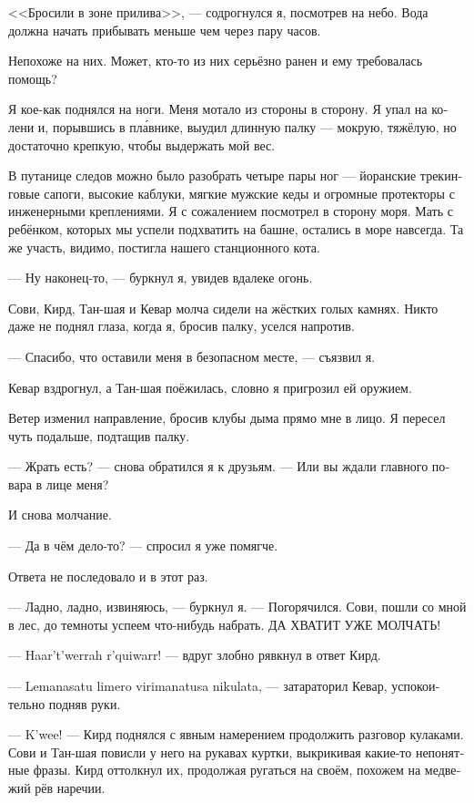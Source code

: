 \documentclass[a4paper,12pt,fleqn]{book}\usepackage{polyglossia}\setdefaultlanguage[babelshorthands=true]{russian}\setotherlanguage{english}\defaultfontfeatures{Ligatures=TeX,Mapping=tex-text}
\newcommand{\asterism}{\vspace{1em}{\centering\Large\bfseries$\ast~\ast~\ast$\par}\vspace{1em}}
\begin{document}
<<Бросили в зоне прилива>>, --- содрогнулся я, посмотрев на небо.
Вода должна начать прибывать меньше чем через пару часов.

Непохоже на них.
Может, кто-то из них серьёзно ранен и ему требовалась помощь?

Я кое-как поднялся на ноги.
Меня мотало из стороны в сторону.
Я упал на колени и, порывшись в пл\'{а}внике, выудил длинную палку --- мокрую, тяжёлую, но достаточно крепкую, чтобы выдержать мой вес.

В путанице следов можно было разобрать четыре пары ног --- йоранские трекинговые сапоги, высокие каблуки, мягкие мужские кеды и огромные протекторы с инженерными креплениями.
Я с сожалением посмотрел в сторону моря.
Мать с ребёнком, которых мы успели подхватить на башне, остались в море навсегда.
Та же участь, видимо, постигла нашего станционного кота.

\asterism

--- Ну наконец-то, --- буркнул я, увидев вдалеке огонь.

Сови, Кирд, Тан-шая и Кевар молча сидели на жёстких голых камнях.
Никто даже не поднял глаза, когда я, бросив палку, уселся напротив.

--- Спасибо, что оставили меня в безопасном месте, --- съязвил я.

Кевар вздрогнул, а Тан-шая поёжилась, словно я пригрозил ей оружием.

Ветер изменил направление, бросив клубы дыма прямо мне в лицо.
Я пересел чуть подальше, подтащив палку.

--- Жрать есть? --- снова обратился я к друзьям.
--- Или вы ждали главного повара в лице меня?

И снова молчание.

--- Да в чём дело-то? --- спросил я уже помягче.

Ответа не последовало и в этот раз.

--- Ладно, ладно, извиняюсь, --- буркнул я.
--- Погорячился.
Сови, пошли со мной в лес, до темноты успеем что-нибудь набрать.
ДА ХВАТИТ УЖЕ МОЛЧАТЬ!

--- Haar't'werrah r'quiwarr! --- вдруг злобно рявкнул в ответ Кирд.

--- Lemanasatu limero virimanatusa nikulata, --- затараторил Кевар, успокоительно подняв руки.

--- K'wee! --- Кирд поднялся с явным намерением продолжить разговор кулаками. 
Сови и Тан-шая повисли у него на рукавах куртки, выкрикивая какие-то непонятные фразы.
Кирд оттолкнул их, продолжая ругаться на своём, похожем на медвежий рёв наречии.
\end{document}
